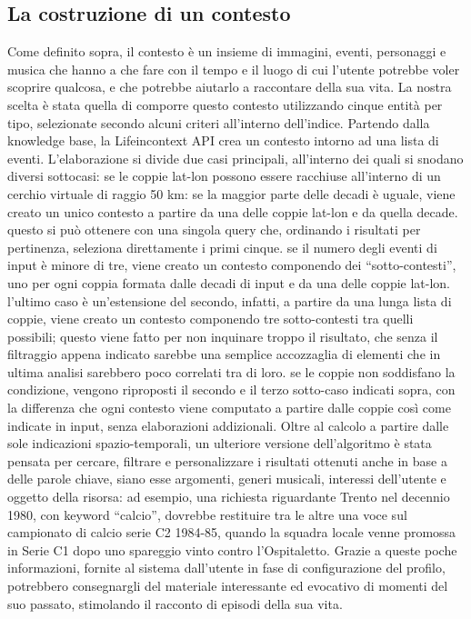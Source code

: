 \documentclass[sigproc-sp.tex]{subfiles}
\begin{document}
\subsection{La costruzione di un contesto}
Come definito sopra, il contesto è un insieme di immagini, eventi, personaggi e musica che hanno a che fare con il tempo e il luogo di cui l’utente potrebbe voler scoprire qualcosa, e che potrebbe aiutarlo a raccontare della sua vita. La nostra scelta è stata quella di comporre questo contesto utilizzando cinque entità per tipo, selezionate secondo alcuni criteri all’interno dell’indice.
Partendo dalla knowledge base, la Lifeincontext API crea un contesto intorno ad una lista di eventi. L’elaborazione si divide due casi principali, all’interno dei quali si snodano diversi sottocasi:
se le coppie lat-lon possono essere racchiuse all’interno di un cerchio virtuale di raggio 50 km:
se la maggior parte delle decadi è uguale, viene creato un unico contesto a partire da una delle coppie lat-lon e da quella decade. questo si può ottenere con una singola query che, ordinando i risultati per pertinenza, seleziona direttamente i primi cinque.
se il numero degli eventi di input è minore di tre, viene creato un contesto componendo dei “sotto-contesti”, uno per ogni coppia formata dalle decadi di input e da una delle coppie lat-lon.
l’ultimo caso è un’estensione del secondo, infatti, a partire da una lunga lista di coppie, viene creato un contesto componendo tre sotto-contesti tra quelli possibili; questo viene fatto per non inquinare troppo il risultato, che senza il filtraggio appena indicato sarebbe una semplice accozzaglia di elementi che in ultima analisi sarebbero poco correlati tra di loro.
se le coppie non soddisfano la condizione, vengono riproposti il secondo e il terzo sotto-caso indicati sopra, con la differenza che ogni contesto viene computato a partire dalle coppie così come indicate in input, senza elaborazioni addizionali.
Oltre al calcolo a partire dalle sole indicazioni spazio-temporali, un ulteriore versione dell’algoritmo è stata pensata per cercare, filtrare e personalizzare i risultati ottenuti anche in base a delle parole chiave, siano esse argomenti, generi musicali, interessi dell’utente e oggetto della risorsa: ad esempio, una richiesta riguardante Trento nel decennio 1980, con keyword “calcio”, dovrebbe restituire tra le altre una voce sul campionato di calcio serie C2 1984-85, quando la squadra locale venne promossa in Serie C1 dopo uno spareggio vinto contro l'Ospitaletto.
Grazie a queste poche informazioni, fornite al sistema dall’utente in fase di configurazione del profilo, potrebbero consegnargli del materiale interessante ed evocativo di momenti del suo passato, stimolando il racconto di episodi della sua vita.
\end{document}
